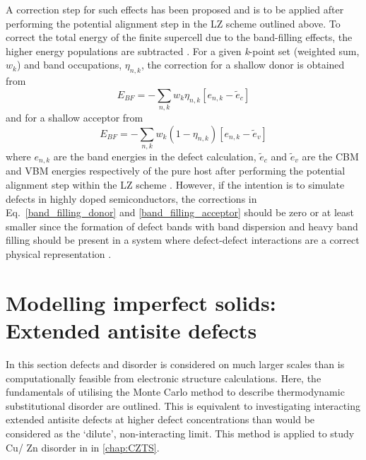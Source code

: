 \documentclass[11pt, twoside]{report}
\begin{document}
A correction step for such effects has been proposed \cite{CIS_defects, Lany_defects_2008, Lany_defects} and is to be applied after performing the potential alignment step in the LZ scheme outlined above.
To correct the total energy of the finite supercell due to the band-filling effects, the higher energy populations are subtracted \cite{CIS_defects}.
For a given \textit{k}-point set (weighted sum, $w_k$) and band occupations, $\eta_{n,k}$, the correction for a shallow donor is obtained from 
\begin{equation}\label{band_filling_donor}
E_{BF} = - \sum_{n,k} w_k \eta_{n,k} [e_{n,k} - \tilde{e}_c]
\end{equation}
and for a shallow acceptor from
\begin{equation}\label{band_filling_acceptor}
E_{BF} = - \sum_{n,k} w_k (1 - \eta_{n,k}) [e_{n,k} - \tilde{e}_v]
\end{equation}
where $e_{n,k}$ are the band energies in the defect calculation, $\tilde{e}_c$ and $\tilde{e}_v$ are the CBM and VBM energies respectively of the pure host after performing the potential alignment step within the LZ scheme \cite{pylada}.
However, if the intention is to simulate defects in highly doped semiconductors, the corrections in Eq.~\ref{band_filling_donor} and \ref{band_filling_acceptor} should be zero or at least smaller since the formation of defect bands with band dispersion and heavy band filling should be present in a system where defect-defect interactions are a correct physical representation \cite{CIS_defects}.


\section{Modelling imperfect solids: Extended antisite defects}\label{MC}
In this section defects and disorder is considered on much larger scales than is computationally feasible from electronic structure calculations.
Here, the fundamentals of utilising the Monte Carlo method to describe thermodynamic substitutional disorder are outlined. This is equivalent to investigating interacting extended antisite defects at higher defect concentrations than would be considered as the `dilute', non-interacting limit. This method is applied to study Cu/ Zn disorder in {\CZTS} in \autoref{chap:CZTS}.
\end{document}
